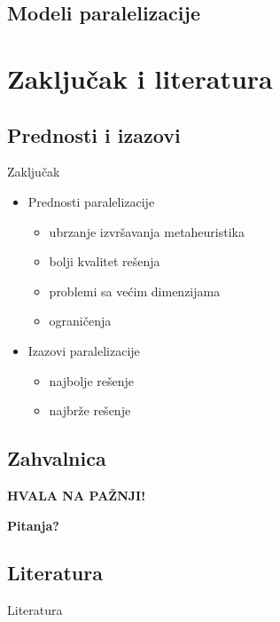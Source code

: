 \documentclass{beamer}
\makeatletter
\newcommand{\dvareda}[2][c]{\begin{tabular}[#1]{@{}c@{}}#2\end{tabular}}
\makeatother
\begin{document}
\subsection{Modeli paralelizacije}

\section{Zaključak i literatura}
\subsection{Prednosti i izazovi}
\begin{frame}{Zaključak}
\begin{itemize}
\item Prednosti paralelizacije
\begin{itemize}

\item ubrzanje izvršavanja metaheuristika

\item bolji kvalitet rešenja

\item problemi sa većim dimenzijama

\item ograničenja
\end{itemize}

\item Izazovi paralelizacije
\begin{itemize}
\item najbolje rešenje

\item najbrže rešenje
\end{itemize}
\end{itemize}
\end{frame}

\subsection{Zahvalnica}
\begin{frame}
\centering \LARGE
\textbf{HVALA NA PAŽNJI!}

\textbf{Pitanja?}
\end{frame}

\subsection{Literatura}
\begin{frame}{Literatura}
\nocite{*}


\end{frame}
\end{document}
